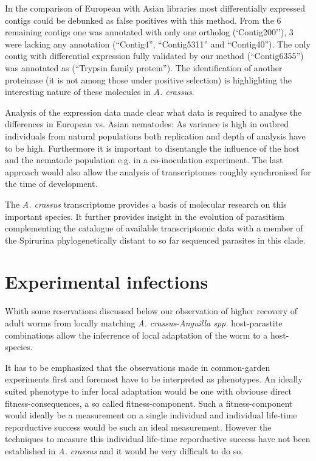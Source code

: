 In the comparison of European with Asian libraries most
differentially expressed contigs could be debunked as false positives
with this method. From the 6 remaining contigs one was annotated with
only one ortholog (`Contig200''), 3 were lacking any annotation
(``Contig4'', ``Contig5311'' and ``Contig40''). The only contig with
differential expression fully validated by our method (``Contig6355'')
was annotated as (``Trypsin family protein''). The identification of
another proteinase (it is not among those under positive selection) is
highlighting the interesting nature of these molecules in
\textit{A. crassus}.

Analysis of the expression data made clear what data is required to
analyse the differences in European vs. Asian nematodes: As variance
is high in outbred individuals from natural populations both
replication and depth of analysis have to be high. Furthermore it is
important to disentangle the influence of the host and the nematode
population e.g. in a co-inoculation experiment. The last approach
would also allow the analysis of transcriptomes roughly synchronised
for the time of development.

The \textit{A. crassus} transcriptome provides a basis of molecular
research on this important species. It further provides insight in
the evolution of parasitism complementing the catalogue of available
transcriptomic data with a member of the Spirurina phylogenetically
distant to so far sequenced parasites in this clade.


\section{Experimental infections}
\label{sec:exp-inf}

Whith some reservations discussed below our observation of higher
recovery of adult worms from locally matching
\textit{A. crassus}-\textit{Anguilla spp.}  host-parastite
combinations allow the inferrence of local adaptation of the worm to a
host-species.

It has to be emphasized that the observations made in common-garden
experiments first and foremost have to be interpreted as
phenotypes. An ideally suited phenotype to infer local adaptation
would be one with obviouse direct fitness-consequences, a so called
fitness-component. Such a fitness-component would ideally be a
measurement on a single individual and individual life-time
reporductive success would be such an ideal measurement. However the
techniques to measure this individual life-time reporductive success
have not been established in \textit{A. crassus} and it would be very
difficult to do so.

